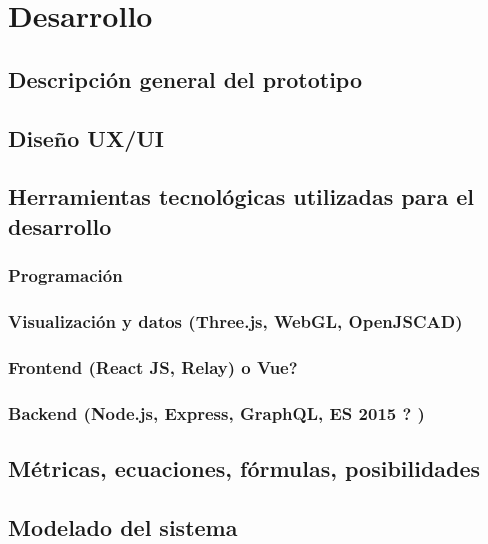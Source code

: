 \chapter{Desarrollo}
\label{chap: cap3}


\section{Descripción general del prototipo}


\section{Diseño UX/UI}


\section{Herramientas tecnológicas utilizadas para el desarrollo}

\subsection{Programación}

\subsection{Visualización y datos (Three.js, WebGL, OpenJSCAD)}

\subsection{Frontend (React JS, Relay) o Vue?}

\subsection{Backend (Node.js, Express, GraphQL, ES 2015 ? )}


\section{Métricas, ecuaciones, fórmulas, posibilidades}


\section{Modelado del sistema}

